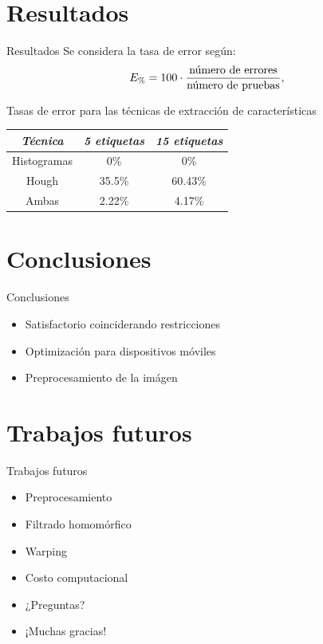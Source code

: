 \documentclass[spanish]{beamer}
\begin{document}
\section{Resultados}
\begin{frame}{Resultados}
  Se considera la tasa de error según:
  \begin{equation*}
    E_{\%}=100\cdot\frac{\textrm{número de errores}}{\textrm{número de pruebas}},
  \end{equation*}

  Tasas de error para las técnicas de extracción de características
  \begin{center}\begin{tabular}{ccc}
      \hline \emph{{Técnica}} & \emph{5 etiquetas} & \emph{15 etiquetas}\\
      \hline Histogramas & 0\% & 0\%\\
      \hline Hough & 35.5\% & 60.43\%\\
      \hline Ambas & 2.22\% & 4.17\%\\
      \hline
  \end{tabular}\end{center}
\end{frame}
%
\section{Conclusiones}
\begin{frame}{Conclusiones}
  \begin{itemize}
  \item Satisfactorio coinciderando restricciones
  \item Optimización para dispositivos móviles
  \item Preprocesamiento de la imágen
  \end{itemize}
\end{frame}
%
\section{Trabajos futuros}
\begin{frame}{Trabajos futuros}
  \begin{itemize}
  \item Preprocesamiento
  \item Filtrado homomórfico
  \item Warping
  \item Costo computacional
  \end{itemize}
\end{frame}
\begin{frame}{}
  \begin{itemize}
  \item<1-1> ¿Preguntas?
  \item<2-2> ¡Muchas gracias!
  \end{itemize}
\end{frame}
\end{document}
